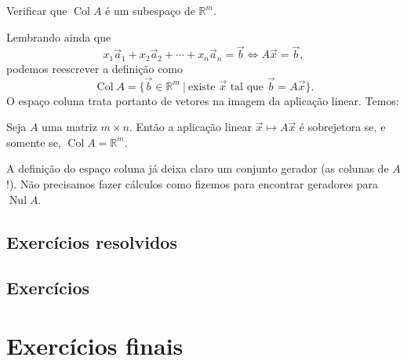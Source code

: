 \begin{exer}
Verificar que $\operatorname{Col} A$ é um subespaço de $\mathbb{R}^m$.
\end{exer}

Lembrando ainda que
\begin{equation}
x_1 \vec{a}_1 + x_2 \vec{a}_2 + \cdots + x_n \vec{a}_n = \vec{b} \iff A \vec{x} = \vec{b},
\end{equation} podemos reescrever a definição como
\begin{equation}
\operatorname{Col} A = \{ \vec{b} \in \mathbb{R}^m \ | \ \text{existe } \vec{x} \text{ tal que } \vec{b} = A \vec{x} \}.
\end{equation} O espaço coluna trata portanto de vetores na imagem da aplicação linear. Temos:

\begin{prop}
	Seja $A$ uma matriz $m\times n$. Então a aplicação linear $\vec{x} \mapsto A \vec{x}$ é sobrejetora se, e somente se, $\operatorname{Col} A = \mathbb{R}^m.$
\end{prop}

A definição do espaço coluna já deixa claro um conjunto gerador (as colunas de $A$!). Não precisamos fazer cálculos como fizemos para encontrar geradores para $\operatorname{Nul} A$.

\subsection*{Exercícios resolvidos}

\construirExeresol

\subsection*{Exercícios}

\construirExer

\section{Exercícios finais}

\construirExer

%
